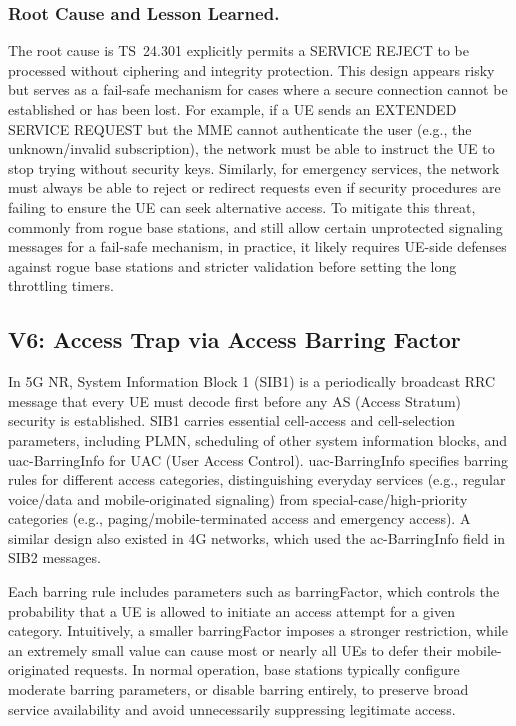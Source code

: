 \subsubsection{Root Cause and Lesson Learned.} The root cause is TS~24.301 explicitly permits a SERVICE REJECT to be processed without ciphering and integrity protection. This design appears risky but serves as a fail-safe mechanism for cases where a secure connection cannot be established or has been lost. For example, if a UE sends an EXTENDED SERVICE REQUEST but the MME cannot authenticate the user (e.g., the unknown/invalid subscription), the network must be able to instruct the UE to stop trying without security keys. Similarly, for emergency services, the network must always be able to reject or redirect requests even if security procedures are failing to ensure the UE can seek alternative access. 
To mitigate this threat, commonly from rogue base stations, and still allow certain unprotected signaling messages for a fail-safe mechanism, in practice, it likely requires UE-side defenses against rogue base stations and stricter validation before setting the long throttling timers. 



\subsection{V6: Access Trap via Access Barring Factor} 


\noindent In 5G NR, System Information Block 1 (SIB1) is a periodically broadcast RRC message that every UE must decode first before any AS (Access Stratum) security is established. SIB1 carries essential cell-access and cell-selection parameters, including PLMN, scheduling of other system information blocks, and uac-BarringInfo for UAC (User Access Control). uac-BarringInfo specifies barring rules for different access categories, distinguishing everyday services (e.g., regular voice/data and mobile-originated signaling) from special-case/high-priority categories (e.g., paging/mobile-terminated access and emergency access). A similar design also existed in 4G networks, which used the ac-BarringInfo field in SIB2 messages.

Each barring rule includes parameters such as barringFactor, which controls the probability that a UE is allowed to initiate an access attempt for a given category. Intuitively, a smaller barringFactor imposes a stronger restriction, while an extremely small value can cause most or nearly all UEs to defer their mobile-originated requests. In normal operation, base stations typically configure moderate barring parameters, or disable barring entirely, to preserve broad service availability and avoid unnecessarily suppressing legitimate access.


